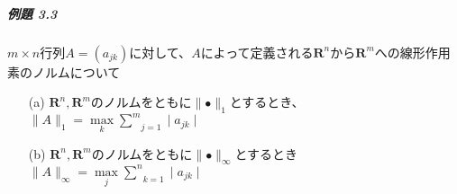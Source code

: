 \documentclass[12pt,a4paper]{article}
\begin{document}
    \subparagraph{例題 3.3}
      $m\times n$行列$A= (a_{jk})$に対して、$A$によって定義される$\mathbf{R}^n$から$\mathbf{R}^m$への線形作用素のノルムについて

      \begin{itemize}
        \item[(a)] $\mathbf{R}^n, \mathbf{R}^m$のノルムをともに$\parallel\bullet\parallel_1$とするとき、 \\
          $\parallel A \parallel_1 = \underset{k}{\max} \underset{j=1}{\overset{m}{\sum}}\mid a_{jk} \mid$
        \item[(b)] $\mathbf{R}^n, \mathbf{R}^m$のノルムをともに$\parallel\bullet\parallel_\infty$とするとき \\
          $\parallel A \parallel_\infty = \underset{j}{\max} \underset{k=1}{\overset{n}{\sum}} \mid a_{jk} \mid$
      \end{itemize}
\end{document}
